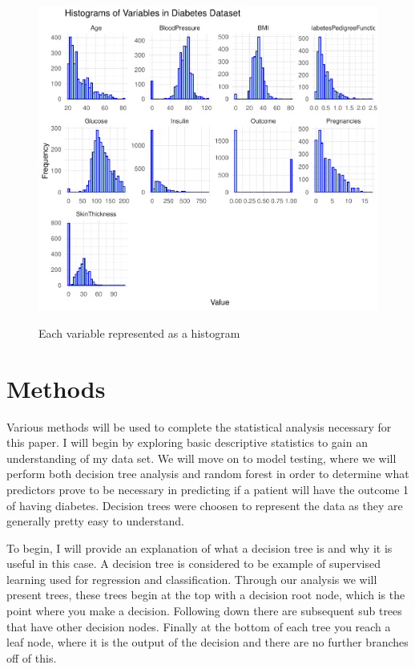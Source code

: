 \documentclass[12pt]{article}
\begin{document}
  \begin{figure}[tbp]
    \centering
    \caption{Each variable represented as a histogram}
      \includegraphics[width=\textwidth]{Histograms.pdf}
      \label{fig:histogram}
      \end{figure}

\section{Methods}
\label{sec:meth}
    Various methods will be used to complete the statistical analysis necessary for this paper. I will begin by exploring basic 
    descriptive statistics to gain an understanding of my data set. We will move on to model testing, where we will perform both 
    decision tree analysis and random forest in order to determine what predictors prove to be necessary in predicting if a patient
    will have the outcome 1 of having diabetes. Decision trees were choosen to represent the data as they are generally pretty easy
    to understand.

    To begin, I will provide an explanation of what a decision tree is and why it is useful in this case. A decision tree is considered
    to be example of supervised learning used for regression and classification. Through our analysis we will present trees, these trees
    begin at the top with a decision root node, which is the point where you make a decision. Following down there are subsequent sub trees
    that have other decision nodes. Finally at the bottom of each tree you reach a leaf node, where it is the output of the decision and 
    there are no further branches off of this.  
    
\end{document}
